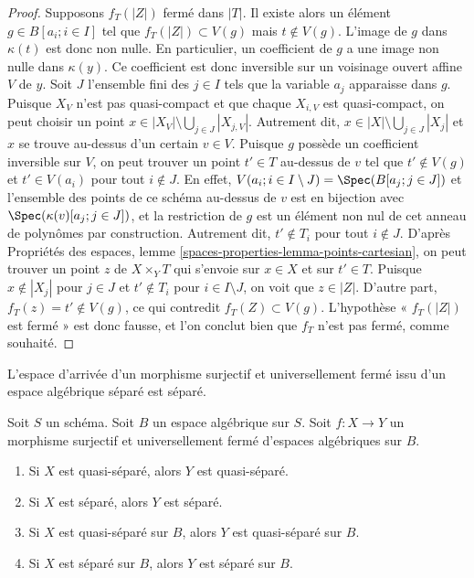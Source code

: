 \begin{proof}
\medskip\noindent
Supposons $f_T(|Z|)$ fermé dans $|T|$. Il existe alors un élément
$g \in B[a_i; i \in I]$ tel que $f_T(|Z|) \subset V(g)$ mais $t \not \in V(g)$.
L'image de $g$ dans $\kappa(t)$ est donc non nulle. En particulier, un
coefficient de $g$ a une image non nulle dans $\kappa(y)$. Ce coefficient est donc
inversible sur un voisinage ouvert affine $V$ de $y$. Soit $J$ l'ensemble fini
des $j \in I$ tels que la variable $a_j$ apparaisse dans $g$.
Puisque $X_V$ n'est pas quasi-compact et que chaque $X_{i, V}$ est quasi-compact,
on peut choisir un point $x \in |X_V| \setminus \bigcup_{j \in J} |X_{j, V}|$.
Autrement dit, $x \in |X| \setminus \bigcup_{j \in J} |X_j|$ et $x$ se trouve
au-dessus d'un certain $v \in V$. Puisque $g$ possède un coefficient inversible sur $V$,
on peut trouver un point $t' \in T$ au-dessus de $v$ tel que $t' \not \in V(g)$ et
$t' \in V(a_i)$ pour tout $i \notin J$. En effet,
$V(a_i; i \in I \setminus J) = \Spec(B[a_j; j\in J])$
et l'ensemble des points de ce schéma au-dessus de $v$ est en bijection
avec $\Spec(\kappa(v)[a_j; j \in J])$, et la restriction de $g$ est
un élément non nul de cet anneau de polynômes par construction.
Autrement dit, $t' \not \in T_i$ pour tout $i \not \in J$. D'après
Propriétés des espaces, lemme \ref{spaces-properties-lemma-points-cartesian},
on peut trouver un point $z$ de $X \times_Y T$ qui s'envoie sur $x \in X$ et sur
$t' \in T$. Puisque $x \not \in |X_j|$ pour $j \in J$ et $t' \not \in T_i$
pour $i \in I \setminus J$, on voit que $z \in |Z|$. D'autre part,
$f_T(z) = t' \not \in V(g)$, ce qui contredit $f_T(Z) \subset V(g)$.
L'hypothèse « $f_T(|Z|)$ est fermé » est donc fausse, et l'on conclut bien
que $f_T$ n'est pas fermé, comme souhaité.
\end{proof}

\noindent
L'espace d'arrivée d'un morphisme surjectif et universellement fermé issu d'un
espace algébrique séparé est séparé.

\begin{lemma}
\label{lemma-image-universally-closed-separated}
Soit $S$ un schéma. Soit $B$ un espace algébrique sur $S$.
Soit $f : X \to Y$ un morphisme surjectif et universellement fermé
d'espaces algébriques sur $B$.
\begin{enumerate}
\item Si $X$ est quasi-séparé, alors $Y$ est quasi-séparé.
\item Si $X$ est séparé, alors $Y$ est séparé.
\item Si $X$ est quasi-séparé sur $B$, alors $Y$ est quasi-séparé sur $B$.
\item Si $X$ est séparé sur $B$, alors $Y$ est séparé sur $B$.
\end{enumerate}
\end{lemma}

